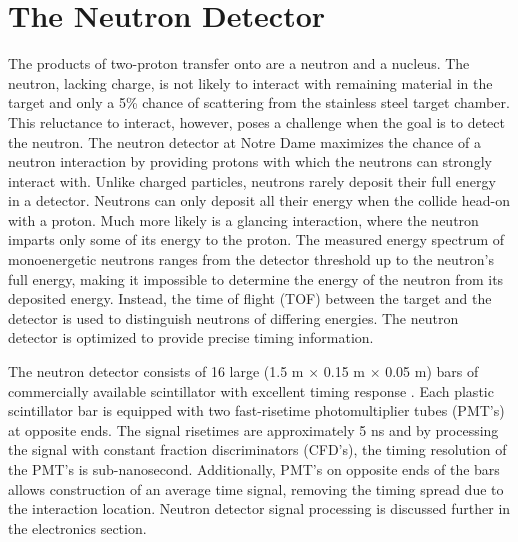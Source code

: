 \section{The Neutron Detector}

The products of two-proton transfer onto \GeTargets are a neutron and a \SeProducts nucleus.  The neutron, lacking charge, is not likely to interact with remaining material in the target and only a 5\% chance of scattering from the stainless steel target chamber.  This reluctance to interact, however, poses a challenge when the goal is to detect the neutron.  The neutron detector at Notre Dame maximizes the chance of a neutron interaction by providing protons with which the neutrons can strongly interact with.  Unlike charged particles, neutrons rarely deposit their full energy in a detector.  Neutrons can only deposit all their energy when the collide head-on with a proton.  Much more likely is a glancing interaction, where the neutron imparts only some of its energy to the proton.  The measured energy spectrum of monoenergetic neutrons ranges from the detector threshold up to the neutron's full energy, making it impossible to determine the energy of the neutron from its deposited energy.  Instead, the time of flight (TOF) between the target and the detector is used to distinguish neutrons of differing energies.  The neutron detector is optimized to provide precise timing information.       

The neutron detector \cite{KolataNeutwall} consists of 16 large (1.5 m $\times$ 0.15 m $\times$ 0.05 m) bars of commercially available scintillator with excellent timing response \cite{BC408}.  Each plastic scintillator bar is equipped with two fast-risetime photomultiplier tubes (PMT's) at opposite ends.  The signal risetimes are approximately 5 ns and by processing the signal with constant fraction discriminators (CFD's), the timing resolution of the PMT's is sub-nanosecond.  Additionally, PMT's on opposite ends of the bars allows construction of an average time signal, removing the timing spread due to the interaction location.  Neutron detector signal processing is discussed further in the electronics section.

